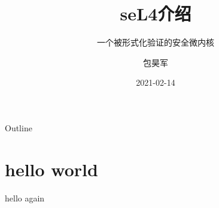 \documentclass[presentation,dvipdfmx,CJKbookmarks]{beamer}
\date{2021-02-14}
\begin{document}
\begin{CJK*}{UTF8}{simsun}

\title{seL4\thinspace 介绍}
\subtitle{一个被形式化验证的安全微内核}
\author{包昊军}

\maketitle
\begin{frame}{Outline}
\tableofcontents
\end{frame}

\CJKtilde


\section{hello world}
\label{sec:orge140313}

\begin{frame}[label={sec:org9f0d99b}]{hello again}
\end{frame}
\end{CJK*}
\end{document}
